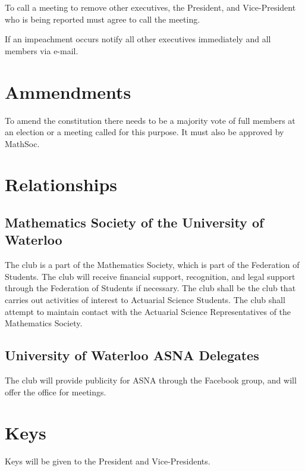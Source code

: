 \documentclass[11pt]{mathsoc}
\begin{document}
To call a meeting to remove other executives, the President, and Vice-President
who is being reported must agree to call the meeting.

If an impeachment occurs notify all other executives immediately and all 
members via e-mail. 

\section{Ammendments}
To amend the constitution there needs to be a majority vote of full members 
at an election or a meeting called for this purpose.  It must also be 
approved by MathSoc.

\section{Relationships}

\subsection{Mathematics Society of the University of Waterloo}
The club is a part of the Mathematics Society, which is part of the Federation 
of Students. The club will receive financial support, recognition, and legal 
support through the Federation of Students if necessary. The club shall be the club 
that carries out activities of interest to Actuarial Science Students. 
The club shall attempt to maintain contact with the Actuarial Science Representatives 
of the Mathematics Society.

\subsection{University of Waterloo ASNA Delegates}
The club will provide publicity for ASNA through the Facebook group, and will 
offer the office for meetings.

\section{Keys}
Keys will be given to the President and Vice-Presidents.
\end{document}
